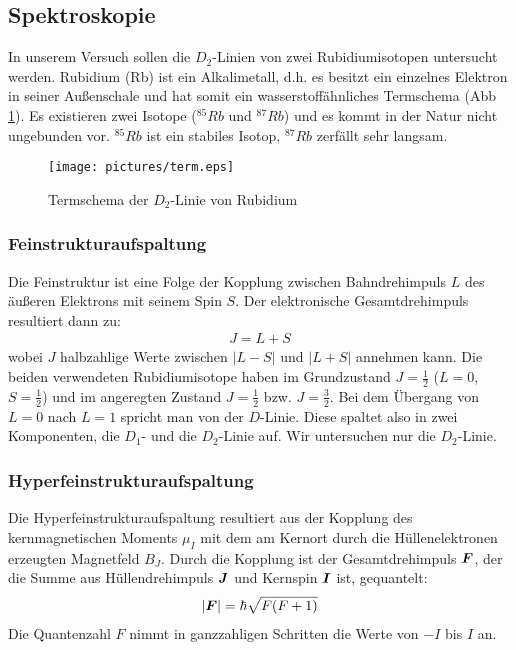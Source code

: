 \documentclass[12pt]{article}
\renewcommand*\vec[1]{{\mbox{\boldmath\ensuremath{#1}}}}
\begin{document}
\subsection{Spektroskopie}
In unserem Versuch sollen die $D_2$-Linien von zwei Rubidiumisotopen untersucht werden. Rubidium (Rb) ist ein Alkalimetall, d.h. es besitzt ein einzelnes Elektron in seiner Außenschale und hat somit ein wasserstoffähnliches Termschema (Abb \ref{term}). Es existieren zwei Isotope ($^{85}Rb$ und $^{87}Rb$) und es kommt in der Natur nicht ungebunden vor. $^{85}Rb$ ist ein stabiles Isotop, $^{87}Rb$ zerfällt sehr langsam.
\begin{figure}[H]
 \texttt{[image: pictures/term.eps]}
 \caption{Termschema der $D_2$-Linie von Rubidium}
 \label{term}
\end{figure}

\subsubsection{Feinstrukturaufspaltung}
Die Feinstruktur ist eine Folge der Kopplung zwischen Bahndrehimpuls $L$ des äußeren Elektrons mit seinem Spin $S$.
Der elektronische Gesamtdrehimpuls resultiert dann zu:
\begin{align}
 J = L + S
\end{align}
wobei $J$ halbzahlige Werte zwischen $|L-S|$ und $|L+S|$ annehmen kann.
Die beiden verwendeten Rubidiumisotope haben im Grundzustand $J = \frac{1}{2}$ ($L = 0$, $S = \frac{1}{2}$) und im angeregten Zustand $J = \frac{1}{2}$ bzw. $J = \frac{3}{2}$. Bei dem Übergang von $L = 0$ nach $L = 1$ spricht man von der $D$-Linie. Diese spaltet also in zwei Komponenten, die $D_1$- und die $D_2$-Linie auf. Wir untersuchen nur die $D_2$-Linie.

\subsubsection{Hyperfeinstrukturaufspaltung}
Die Hyperfeinstrukturaufspaltung resultiert aus der Kopplung des kernmagnetischen Moments $\mu_I$ mit dem am Kernort durch die Hüllenelektronen erzeugten Magnetfeld $B_J$.
Durch die Kopplung ist der Gesamtdrehimpuls $\vec{F}$, der die Summe aus Hüllendrehimpuls $\vec{J}$ und Kernspin $\vec{I}$ ist, gequantelt:
\begin{align*}
 \left|\vec{F}\right| = \hbar \sqrt{F(F+1)}
\end{align*}
Die Quantenzahl $F$ nimmt in ganzzahligen Schritten die Werte von $-I$ bis $I$ an.
\end{document}
